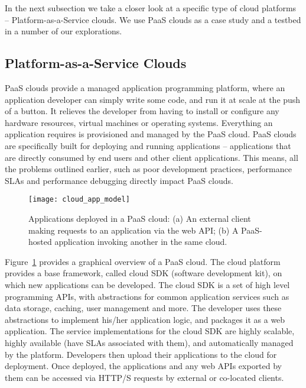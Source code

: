 In the next subsection we take a closer look at a specific type of cloud platforms -- Platform-as-a-Service clouds.
We use PaaS clouds as a case study and a testbed in a number of our explorations.

\subsection{Platform-as-a-Service Clouds}
PaaS clouds provide a managed application programming platform, where an application developer can simply 
write some code, and run it at scale at the push of a button. It relieves the developer from having to install or configure
any hardware resources, virtual machines or operating systems. Everything an application requires is provisioned
and managed by the PaaS cloud. PaaS clouds are specifically built for deploying and running applications -- 
applications that are directly consumed by end users and other client applications. This means, all the problems 
outlined earlier, such as poor development practices, performance SLAs and performance debugging directly 
impact PaaS clouds. 

\begin{figure}
\centering
\texttt{[image: cloud\_app\_model]}
\caption{Applications deployed in a PaaS cloud: (a) An external client making requests
to an application via the web API;
(b) A PaaS-hosted application invoking another in the same cloud.
\label{fig:cloud_app_model}
}
\vspace{-0.2in}
\end{figure}

Figure~\ref{fig:cloud_app_model} provides a graphical overview of a PaaS cloud. 
The cloud platform provides a base 
framework, called cloud SDK (software development kit), on which new applications can be developed. 
The cloud SDK 
is a set of high level programming APIs, with abstractions for common application services such as data storage, caching, 
user management and more. The developer uses these abstractions to implement his/her application logic, and packages it 
as a web application. The service implementations for the 
cloud SDK are highly scalable, highly available (have SLAs associated with them),
and automatically managed by the platform. Developers then
upload their applications to the cloud for deployment.
Once deployed, the applications and any web APIs exported by them can be accessed 
via HTTP/S requests by external or co-located clients.